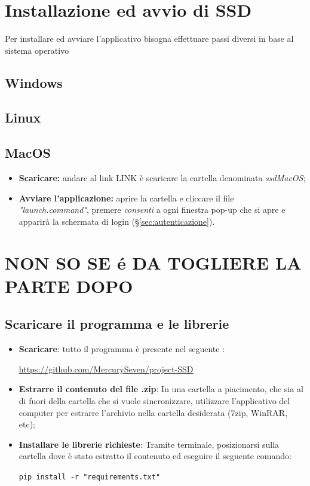\section{Installazione ed avvio di SSD}
Per installare ed avviare l'applicativo  bisogna effettuare passi diversi in base al sistema operativo 

\subsection{Windows}

\subsection{Linux}

\subsection{MacOS}

\begin{itemize}
\item \textbf{Scaricare:} andare al link LINK è scaricare la cartella denominata \textit{ssdMacOS};
\item \textbf{Avviare l'applicazione:} aprire la cartella e cliccare il file \textit{"launch.command"}, premere \textit{consenti} a ogni finestra pop-up che si apre e apparirà la schermata di login (\S{}\ref{sec:autenticazione}).
\end{itemize}

\section*{NON SO SE é DA TOGLIERE LA PARTE DOPO}
\subsection{Scaricare il programma e le librerie}

\begin{itemize}
	\item \textbf{Scaricare}: tutto il programma è presente nel seguente :\newline{}
\centerline{\url{https://github.com/MercurySeven/project-SSD}}

	\item \textbf{Estrarre il contenuto del file .zip}: In una cartella a piacimento, che sia al di fuori della cartella che si vuole sincronizzare, utilizzare l'applicativo del computer per estrarre l'archivio nella cartella desiderata (7zip, WinRAR, etc);
	\item \textbf{Installare le librerie richieste}:
	Tramite terminale, posizionarsi sulla cartella dove è stato estratto il contenuto ed eseguire il seguente comando:\newline{}
	\centerline{\texttt{pip install -r "requirements.txt"}}
\end{itemize}

